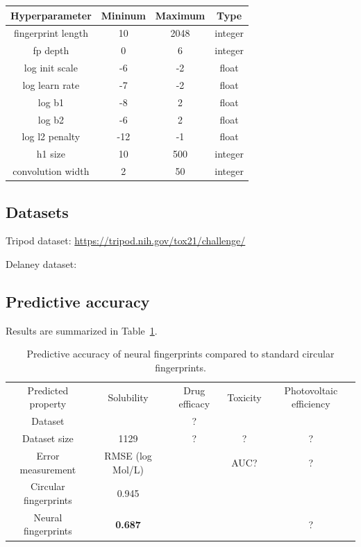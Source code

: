 \documentclass{article}
\begin{document}
\begin{table}
\center
\begin{tabular}{c|ccc}
Hyperparameter & Mininum & Maximum & Type \\
\hline
fingerprint length & 10   &   2048  & integer \\
fp depth  & 0 &       6 &     integer \\
log init scale & -6 &      -2 &     float \\
log learn rate & -7 &      -2 &    float \\
log b1 & -8 &      2 &    float \\
log b2 & -6 &     2 &   float \\
log l2 penalty & -12 &     -1 &   float \\
h1 size & 10   &   500  & integer \\
\hline 
convolution width & 2 & 50 & integer
\end{tabular}
\end{table}



\subsection{Datasets}

Tripod dataset: \url{https://tripod.nih.gov/tox21/challenge/}
\cite{unterthiner2015toxicity}

Delaney dataset:
\cite{delaney_data_2004}


\subsection{Predictive accuracy}

Results are summarized in Table~\ref{table:main results}.

\begin{table}
\begin{tabular}{c|cccc}
Predicted property    & Solubility     &  Drug efficacy & Toxicity        & Photovoltaic efficiency \\
Dataset               & \citet{delaney_data_2004} &  ?             &  \citet{tox21}  &  \citet{hachmann2011harvard} \\
Dataset size          &    1129        &    ?           &  ?              &    ?  \\
Error measurement     & RMSE (log Mol/L) &              & AUC?            & ? \\
\hline
Circular fingerprints &  0.945  &   &   &  \\
Neural fingerprints   &  \bf{0.687}  &   &   &?
\end{tabular}
\label{table:main results}
\caption{Predictive accuracy of neural fingerprints compared to standard circular fingerprints.}
\end{table}
\end{document}
